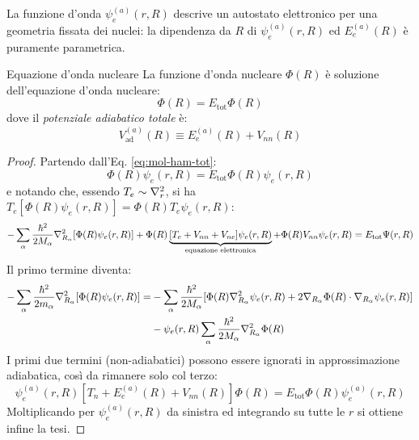 La funzione d'onda $ \psi_e^{(a)}(r,R) $ descrive un autostato elettronico per una geometria fissata dei nuclei: la dipendenza da $ R $ di $ \psi_e^{(a)}(r,R) $ ed $ E_e^{(a)}(R) $ è puramente parametrica.

\begin{proposition}{Equazione d'onda nucleare}{}
	La funzione d'onda nucleare $ \Phi(R) $ è soluzione dell'equazione d'onda nucleare:
	\begin{equation}
		[T_n + V_\text{ad}^{(a)}(R)] \Phi(R) = E_\text{tot} \Phi(R)
		\label{eq:mol-nucl-eq}
	\end{equation}
	dove il \textit{potenziale adiabatico totale} è:
	\begin{equation}
		V_\text{ad}^{(a)}(R) \equiv E_e^{(a)}(R) + V_{nn}(R)
	\end{equation}

	\tcblower

	\begin{proof}
		Partendo dall'Eq. \ref{eq:mol-ham-tot}:
		\begin{equation*}
			[T_n + T_e + V_{nn} + V_{ne} + V_{ee}] \Phi(R) \psi_e(r,R) = E_\text{tot} \Phi(R) \psi_e(r,R)
		\end{equation*}
		e notando che, essendo $ T_e \sim \nabla^2_r $, si ha $ T_e [\Phi(R) \psi_e(r,R)] = \Phi(R) T_e \psi_e(r,R) $:
		\begin{equation*}
			- \sum_\alpha \frac{\hbar^2}{2M_\alpha} \nabla^2_{R_\alpha} [\Phi(R) \psi_e(r,R)] + \Phi(R) \underbrace{[T_e + V_{nn} + V_{ne}] \psi_e(r,R)}_{\text{equazione elettronica}} + \Phi(R) V_{nn} \psi_e(r,R) = E_\text{tot} \Psi(r,R)
		\end{equation*}
		Il primo termine diventa:
		\begin{equation*}
			\begin{split}
				- \sum_\alpha \frac{\hbar^2}{2m_\alpha} \nabla^2_{R_\alpha} [\Phi(R) \psi_e(r,R)]
				= & - \sum_\alpha \frac{\hbar^2}{2M_\alpha} [\Phi(R) \nabla^2_{R_\alpha} \psi_e(r,R) + 2 \nabla_{R_\alpha} \Phi(R) \cdot \nabla_{R_\alpha} \psi_e(r,R)] \\
				& - \psi_e(r,R) \sum_\alpha \frac{\hbar^2}{2M_\alpha} \nabla^2_{R_\alpha} \Phi(R)
			\end{split}
		\end{equation*}
		I primi due termini (non-adiabatici) possono essere ignorati in approssimazione adiabatica, così da rimanere solo col terzo:
		\begin{equation*}
			\psi_e^{(a)}(r,R) [T_n + E_e^{(a)}(R) + V_{nn}(R)] \Phi(R) = E_\text{tot} \Phi(R) \psi_e^{(a)}(r,R)
		\end{equation*}
		Moltiplicando per $ \psi_e^{(a)}(r,R) $ da sinistra ed integrando su tutte le $ r $ si ottiene infine la tesi.
	\end{proof}
\end{proposition}

